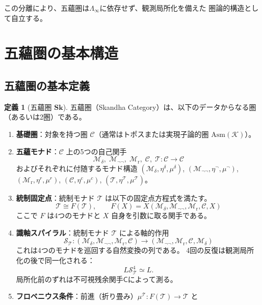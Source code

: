 \documentclass[11pt,a4paper]{ltjsarticle}
\theoremstyle{definition}
\newtheorem{definition}{定義}[section]
\newcommand{\Sk}{\mathbf{Sk}}
\newcommand{\Asm}{\mathrm{Asm}}
\newcommand{\Mdelta}{\mathcal{M}_{\delta}}
\newcommand{\Mneg}{\mathcal{M}_{\neg\neg}}
\newcommand{\Mr}{\mathcal{M}_{\mathrm{r}}}
\newcommand{\Mc}{\mathcal{C}}
\newcommand{\T}{\mathcal{T}}
\newcommand{\SpiralT}{\mathcal{S}_{\mathcal{T}}}
\newcommand{\fold}{\mu}
\newcommand{\LawvereInfinity}{\Lambda_\infty}
\newcommand{\Residual}{\mathsf{C}}
\begin{document}
この分離により、五蘊圏は$\LawvereInfinity$に依存せず、観測局所化を備えた
圏論的構造として自立する。

\section{五蘊圏の基本構造}

\subsection{五蘊圏の基本定義}

\begin{definition}[五蘊圏 $\Sk$]\label{def:skandha}
五蘊圏（Skandha Category）は、以下のデータからなる圏（あるいは2圏）である。
\begin{enumerate}[label=(\arabic*)]
\item \textbf{基礎圏}：対象を持つ圏 $\mathcal{C}$（通常はトポスまたは実現子論的圏 $\Asm(\mathcal{K})$）。
\item \textbf{五蘊モナド}：$\mathcal{C}$ 上の5つの自己関手
  \begin{equation}
  \Mdelta,\; \Mneg,\; \Mr,\; \Mc,\; \T : \mathcal{C} \to \mathcal{C}
  \end{equation}
  およびそれぞれに付随するモナド構造
  $(\Mdelta, \eta^\delta, \mu^\delta)$,
  $(\Mneg, \eta^\neg, \mu^\neg)$,
  $(\Mr, \eta^r, \mu^r)$,
  $(\Mc, \eta^c, \mu^c)$,
  $(\T, \eta^\T, \mu^\T)$。
\item \textbf{統制固定点}：統制モナド $\T$ は以下の固定点方程式を満たす。
  \begin{equation}
  \T \cong F(\T), \qquad F(X) = X(\Mdelta, \Mneg, \Mr, \Mc, X)
  \label{eq:fixed-point}
  \end{equation}
  ここで $F$ は4つのモナドと $X$ 自身を引数に取る関手である。
\item \textbf{識軸スパイラル}：統制モナド $\T$ による軸的作用
  \begin{equation}
  \SpiralT : (\Mdelta, \Mneg, \Mr, \Mc) \longrightarrow 
             (\Mneg, \Mr, \Mc, \Mdelta)
  \label{eq:spiral}
  \end{equation}
  これは4つのモナドを巡回する自然変換の列である。
  4回の反復は観測局所化の後で同一化される：
  \begin{equation}
  L\SpiralT^4 \simeq L.
  \end{equation}
  局所化前のずれは不可視残余関手$\Residual$によって測る。
\item \textbf{フロベニウス条件}：前進（折り畳み）$\fold^\T : F(\T) \to \T$ と

\end{enumerate}
\end{definition}
\end{document}
